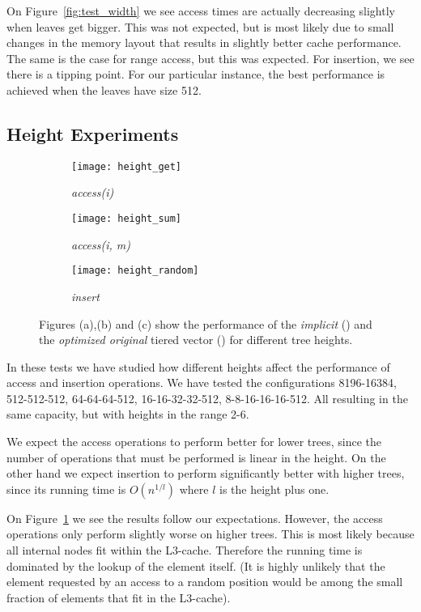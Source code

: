 On Figure~\ref{fig:test_width} we see access times are actually decreasing
slightly when leaves get bigger. This was not expected, but is most likely
due to small changes in the memory layout that results in slightly better cache
performance. The same is the case for range access, but this was expected. For
insertion, we see there is a tipping point. For our particular instance, the
best performance is achieved when the leaves have size 512.


\subsection{Height Experiments}

\begin{figure}
	\centering
	\begin{subfigure}[b]{0.3\textwidth}
		\texttt{[image: height\_get]}
		\caption{\textit{access(i)}}
	\end{subfigure}
	\begin{subfigure}[b]{0.3\textwidth}
		\texttt{[image: height\_sum]}
		\caption{\textit{access(i, m)}}
	\end{subfigure}
	\begin{subfigure}[b]{0.3\textwidth}
		\texttt{[image: height\_random]}
		\caption{\textit{insert}}
	\end{subfigure}
	\caption{Figures (a),(b) and (c) show the performance of the \textit{implicit} (\protect\purple) and
		the \textit{optimized original} tiered vector (\protect\green) for different tree heights.}
\label{fig:test_height}
\end{figure}

In these tests we have studied how different heights affect the performance of
access and insertion operations. We have tested the configurations 8196-16384,
512-512-512, 64-64-64-512, 16-16-32-32-512, 8-8-16-16-16-512. All resulting in
the same capacity, but with heights in the range 2-6.

We expect the access operations to perform better for lower trees, since
the number of operations that must be performed is linear in the height. On the
other hand we expect insertion to perform significantly better with higher
trees, since its running time is $O(n^{1/l})$ where $l$ is the height plus one. 

On Figure~\ref{fig:test_height} we see the results follow our expectations. However, the access operations only perform slightly worse on higher trees.
This is most likely because all internal nodes fit within the L3-cache. Therefore the running time is dominated by the lookup of the element itself.
(It is highly unlikely that the element requested by an access 
to a random position would be among the small fraction of elements that
fit in the L3-cache).

